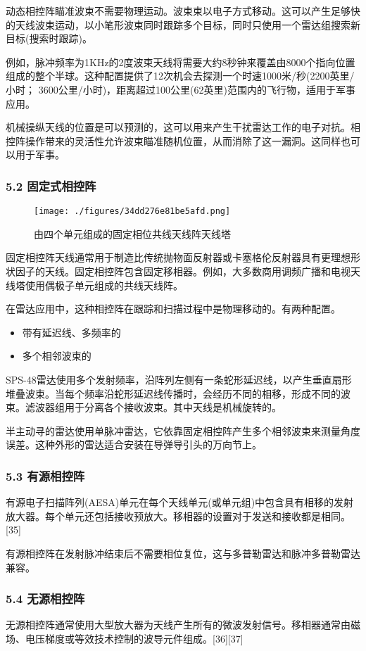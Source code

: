 动态相控阵瞄准波束不需要物理运动。波束束以电子方式移动。这可以产生足够快的天线波束运动，以小笔形波束同时跟踪多个目标，同时只使用一个雷达组搜索新目标(搜索时跟踪)。

例如，脉冲频率为1KHz的2度波束天线将需要大约8秒钟来覆盖由8000个指向位置组成的整个半球。这种配置提供了12次机会去探测一个时速1000米/秒(2200英里/小时； 3600公里/小时)，距离超过100公里(62英里)范围内的飞行物，适用于军事应用。

机械操纵天线的位置是可以预测的，这可以用来产生干扰雷达工作的电子对抗。相控阵操作带来的灵活性允许波束瞄准随机位置，从而消除了这一漏洞。这同样也可以用于军事。

\subsubsection{5.2 固定式相控阵}
\begin{figure}[ht]
\centering
\texttt{[image: ./figures/34dd276e81be5afd.png]}
\caption{由四个单元组成的固定相位共线天线阵天线塔} \label{fig_XKZ_12}
\end{figure}
固定相控阵天线通常用于制造比传统抛物面反射器或卡塞格伦反射器具有更理想形状因子的天线。固定相控阵包含固定移相器。例如，大多数商用调频广播和电视天线塔使用偶极子单元组成的共线天线阵。

在雷达应用中，这种相控阵在跟踪和扫描过程中是物理移动的。有两种配置。
\begin{itemize}
\item 带有延迟线、多频率的
\item 多个相邻波束的
\end{itemize}
SPS-48雷达使用多个发射频率，沿阵列左侧有一条蛇形延迟线，以产生垂直扇形堆叠波束。当每个频率沿蛇形延迟线传播时，会经历不同的相移，形成不同的波束。滤波器组用于分离各个接收波束。其中天线是机械旋转的。

半主动寻的雷达使用单脉冲雷达，它依靠固定相控阵产生多个相邻波束来测量角度误差。这种外形的雷达适合安装在导弹导引头的万向节上。

\subsubsection{5.3 有源相控阵}
有源电子扫描阵列(AESA)单元在每个天线单元(或单元组)中包含具有相移的发射放大器。每个单元还包括接收预放大。移相器的设置对于发送和接收都是相同。[35]

有源相控阵在发射脉冲结束后不需要相位复位，这与多普勒雷达和脉冲多普勒雷达兼容。

\subsubsection{5.4 无源相控阵}
无源相控阵通常使用大型放大器为天线产生所有的微波发射信号。移相器通常由磁场、电压梯度或等效技术控制的波导元件组成。[36][37]

